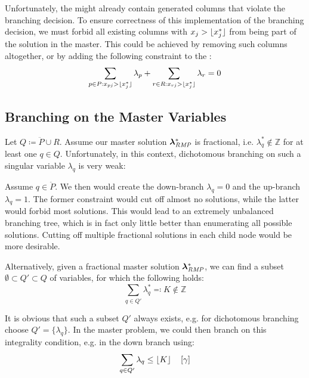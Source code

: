 Unfortunately, the \RMP{} might already contain generated columns that violate the branching decision. To ensure correctness of this implementation of the branching decision, we must forbid all existing columns with $x_j > \lfloor x_j^*\rfloor$ from being part of the solution in the master. This could be achieved by removing such columns altogether, or by adding the following constraint to the \MP{}:
\begin{equation}
\sum_{p \in P: x_{pj} > \lfloor x_j^*\rfloor} \lambda_p + \sum_{r \in R: x_{rj} > \lfloor x_j^*\rfloor} \lambda_r = 0
\end{equation}

\subsection{Branching on the Master Variables}\label{sec:cg_bp_bp_branching_master}
Let $Q \coloneqq \ddot{P} \cup R$. Assume our master solution ${\bm{\lambda}}^*_{\textit{RMP}}{}$ is fractional, i.e. $\lambda_q^* \not\in \mathbb{Z}$ for at least one $q \in Q$. Unfortunately, in this context, dichotomous branching on such a singular variable $\lambda_q$ is very weak:

Assume $q \in \ddot{P}$. We then would create the down-branch $\lambda_q = 0$ and the up-branch $\lambda_q = 1$. The former constraint would cut off almost no solutions, while the latter would forbid most solutions. This would lead to an extremely unbalanced branching tree, which is in fact only little better than enumerating all possible solutions. Cutting off multiple fractional solutions in each child node would be more desirable.

Alternatively, given a fractional master solution ${\bm{\lambda}}^*_{\textit{RMP}}{}$, we can find a subset $\emptyset \subset Q' \subset Q$ of variables, for which the following holds:
\begin{equation}
\sum_{q \in Q'} \lambda_q^* \eqqcolon K \not\in \mathbb{Z}
\end{equation}

It is obvious that such a subset $Q'$ always exists, e.g. for dichotomous branching choose $Q' = \{\lambda_q\}$. In the master problem, we could then branch on this integrality condition, e.g. in the down branch using:
\begin{equation}
\sum_{q \in Q'} \lambda_q \leq \lfloor K\rfloor \quad \left[\gamma\right]
\end{equation}

